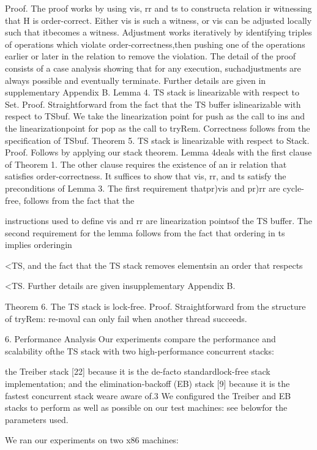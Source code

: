 Proof. The proof works by using vis, rr and ts to constructa relation ir witnessing that H is order-correct. Either vis is
such a witness, or vis can be adjusted locally such that itbecomes a witness. Adjustment works iteratively by identifying triples of operations which violate order-correctness,then pushing one of the operations earlier or later in the relation to remove the violation. The detail of the proof consists of a case analysis showing that for any execution, suchadjustments are always possible and eventually terminate.
Further details are given in supplementary Appendix B.
Lemma 4. TS stack is linearizable with respect to Set.
Proof. Straightforward from the fact that the TS buffer islinearizable with respect to TSbuf. We take the linearization point for push as the call to ins and the linearizationpoint for pop as the call to tryRem. Correctness follows from
the specification of TSbuf.
Theorem 5. TS stack is linearizable with respect to Stack.
Proof. Follows by applying our stack theorem. Lemma 4deals with the first clause of Theorem 1. The other clause
requires the existence of an ir relation that satisfies order-correctness. It suffices to show that vis, rr, and ts satisfy
the preconditions of Lemma 3. The first requirement thatpr)vis and pr)rr are cycle-free, follows from the fact that the

instructions used to define vis and rr are linearization pointsof the TS buffer. The second requirement for the lemma
follows from the fact that ordering in ts implies orderingin

<TS, and the fact that the TS stack removes elementsin an order that respects

<TS. Further details are given insupplementary Appendix B.

Theorem 6. The TS stack is lock-free.
Proof. Straightforward from the structure of tryRem: re-moval can only fail when another thread succeeds.

6. Performance Analysis
Our experiments compare the performance and scalability ofthe TS stack with two high-performance concurrent stacks:

the Treiber stack [22] because it is the de-facto standardlock-free stack implementation; and the elimination-backoff
(EB) stack [9] because it is the fastest concurrent stack weare aware of.3 We configured the Treiber and EB stacks to
perform as well as possible on our test machines: see belowfor the parameters used.

We ran our experiments on two x86 machines:


